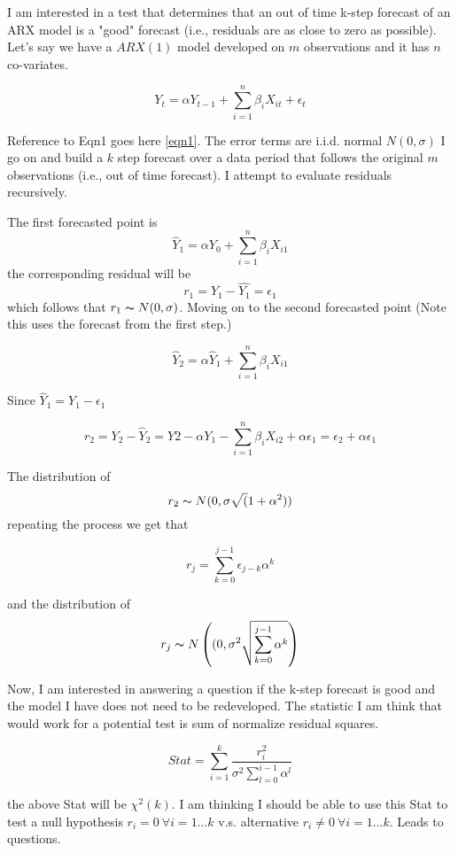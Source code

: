 \documentclass[11pt]{amsart}
\begin{document}
\noindent
I am interested in a test that determines that an out of time k-step forecast of an ARX model is a "good" forecast (i.e., residuals are as close to zero as possible).\\

\noindent
Let's say we have a $ARX(1)$ model developed on $m$ observations and it has $n$ co-variates.

\begin{equation}
Y_t=\alpha Y_{t-1}+\sum_{i=1}^n \beta_i X_{it} + \epsilon_t
\end{equation}\label{eqn1}


Reference to Eqn1 goes here \eqref{eqn1}.
\noindent
The error terms are i.i.d. normal $N(0,\sigma)$ I go on and build a $k$ step forecast over a data period that follows the original $m$ observations (i.e., out of time forecast). I attempt to evaluate residuals recursively.

The first forecasted point is
$$ \hat{Y}_1=\alpha Y_0 + \sum_{i=1}^n \beta_i X_{i1} $$
the corresponding residual will be
$$r_1 =  Y_1-\hat{Y_1} = \epsilon_1$$
which follows that $r_1 \thicksim N(0,\sigma)$. Moving on to the second forecasted point (Note this uses the forecast from the first step.)

$$ \hat{Y}_2=\alpha \hat{Y}_1 + \sum_{i=1}^n \beta_i X_{i1} $$

\noindent
Since $\hat{Y}_1=Y_1 - \epsilon_1$

$$r_2= Y_2-\hat{Y}_2 =Y2 - \alpha Y_1 - \sum_{i=1}^n \beta_i X_{i2}+\alpha \epsilon_1 =\epsilon_2+\alpha \epsilon_1$$

\noindent
The distribution of $$r_2\thicksim N(0,\sigma\sqrt(1+\alpha^2)) $$ repeating the process we get that 

$$r_j=\sum_{k=0}^{j-1} \epsilon_{j-k} \alpha^k$$

\noindent
and the distribution of $$r_j \thicksim N\left((0,\sigma^2 \sqrt{\sum_{k=0}^{j-1}\alpha^k} \right) $$

\noindent
Now, I am interested in answering a question if the k-step forecast is good and the model I have does not need to be redeveloped. The statistic I am think that would work for a potential test is sum of normalize residual squares.

$$ Stat= \sum_{i=1}^k \frac{r_i^2}{\sigma^2\sum_{l=0}^{i-1}\alpha^l} $$

\noindent
the above Stat will be $\chi^2(k)$. I am thinking I should be able to use this Stat to test a null hypothesis $r_i=0 \ \forall i=1...k$ v.s. alternative $r_i\neq 0 \ \forall i=1...k$. Leads to questions.\\
\end{document}
